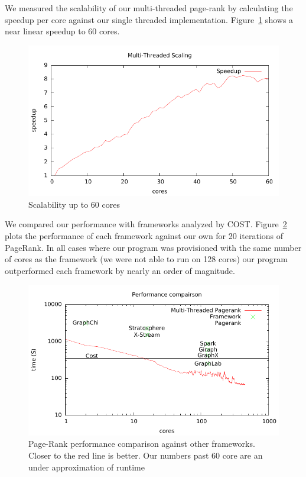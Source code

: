 We measured the scalability of our multi-threaded page-rank by
calculating the speedup per core against our single threaded
implementation. Figure~\ref{fig:scalability} shows a near linear speedup
to 60 cores.

\begin{figure}[h]
\includegraphics[width=\linewidth]{"fig/scale"}
\caption{Scalability up to 60 cores}
\label{fig:scalability}
\end{figure}


We compared our performance with frameworks analyzed by COST.
Figure~\ref{fig:page-rank-compairison} plots the performance of each
framework against our own for 20 iterations of PageRank. In all cases
where our program was provisioned with the same number of cores as the
framework (we were not able to run on 128 cores) our program
outperformed each framework by nearly an order of magnitude.

\begin{figure}[h]
\includegraphics[width=\linewidth]{"fig/page_rank_compairison"}
\caption{Page-Rank performance comparison against other frameworks. Closer to the red line is better. Our numbers past 60 core are an under approximation of runtime}
\label{fig:page-rank-compairison}
\end{figure}

